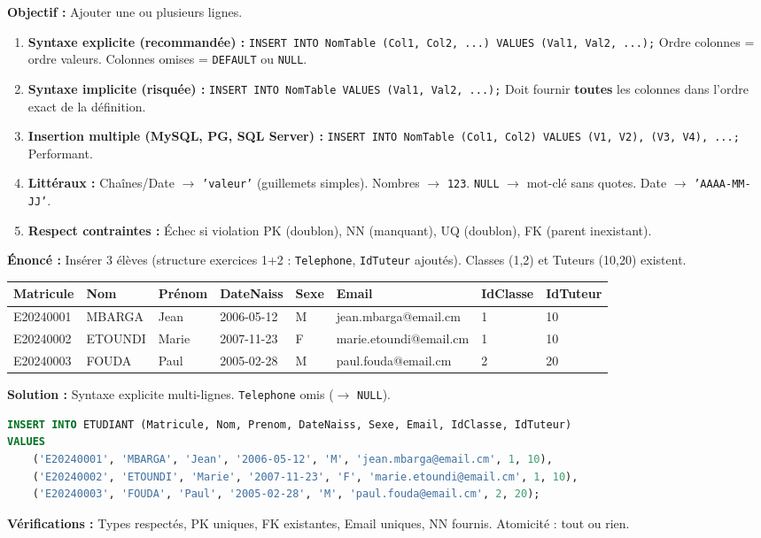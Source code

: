 \documentclass[11pt]{article}
\begin{document}
\begin{methode}
\textbf{Objectif :} Ajouter une ou plusieurs lignes.
\begin{enumerate}
    \item \textbf{Syntaxe explicite (recommandée) :} \texttt{INSERT INTO NomTable (Col1, Col2, ...) VALUES (Val1, Val2, ...);} Ordre colonnes = ordre valeurs. Colonnes omises = \texttt{DEFAULT} ou \texttt{NULL}.
    \item \textbf{Syntaxe implicite (risquée) :} \texttt{INSERT INTO NomTable VALUES (Val1, Val2, ...);} Doit fournir \textbf{toutes} les colonnes dans l'ordre exact de la définition.
    \item \textbf{Insertion multiple (MySQL, PG, SQL Server) :} \texttt{INSERT INTO NomTable (Col1, Col2) VALUES (V1, V2), (V3, V4), ...;} Performant.
    \item \textbf{Littéraux :} Chaînes/Date $\rightarrow$ \texttt{'valeur'} (guillemets simples). Nombres $\rightarrow$ \texttt{123}. \texttt{NULL} $\rightarrow$ mot-clé sans quotes. Date $\rightarrow$ \texttt{'AAAA-MM-JJ'}.
    \item \textbf{Respect contraintes :} Échec si violation PK (doublon), NN (manquant), UQ (doublon), FK (parent inexistant).
\end{enumerate}
\end{methode}

\begin{exoresolu}
\textbf{Énoncé :} Insérer 3 élèves (structure exercices 1+2 : \texttt{Telephone}, \texttt{IdTuteur} ajoutés). Classes (1,2) et Tuteurs (10,20) existent.

\begin{center}
\begin{tabular}{|l|l|l|l|l|l|l|l|}
\hline
Matricule & Nom & Prénom & DateNaiss & Sexe & Email & IdClasse & IdTuteur \\ \hline
E20240001 & MBARGA & Jean & 2006-05-12 & M & jean.mbarga@email.cm & 1 & 10 \\ \hline
E20240002 & ETOUNDI & Marie & 2007-11-23 & F & marie.etoundi@email.cm & 1 & 10 \\ \hline
E20240003 & FOUDA & Paul & 2005-02-28 & M & paul.fouda@email.cm & 2 & 20 \\ \hline
\end{tabular}
\end{center}

\tcblower
\textbf{Solution :} Syntaxe explicite multi-lignes. \texttt{Telephone} omis ($\rightarrow$ \texttt{NULL}).
\begin{lstlisting}[language=SQL]
INSERT INTO ETUDIANT (Matricule, Nom, Prenom, DateNaiss, Sexe, Email, IdClasse, IdTuteur)
VALUES
    ('E20240001', 'MBARGA', 'Jean', '2006-05-12', 'M', 'jean.mbarga@email.cm', 1, 10),
    ('E20240002', 'ETOUNDI', 'Marie', '2007-11-23', 'F', 'marie.etoundi@email.cm', 1, 10),
    ('E20240003', 'FOUDA', 'Paul', '2005-02-28', 'M', 'paul.fouda@email.cm', 2, 20);
\end{lstlisting}
\textbf{Vérifications :} Types respectés, PK uniques, FK existantes, Email uniques, NN fournis. Atomicité : tout ou rien.
\end{exoresolu}
\end{document}
